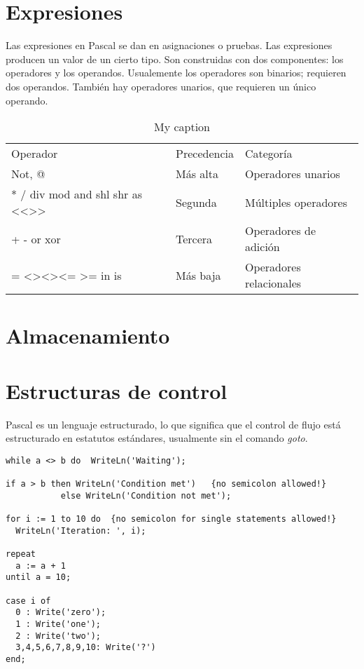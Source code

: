 \documentclass{IEEEtran}
\begin{document}
\section{Expresiones}
Las expresiones en Pascal se dan en asignaciones o pruebas. Las expresiones producen un valor de un cierto tipo. Son construidas con dos componentes: los operadores y los operandos. Usualemente los operadores son binarios; requieren dos operandos. Tambi\'en hay operadores unarios, que requieren un \'unico operando.
\begin{table}[]
\centering
\caption{My caption}
\label{my-label}
\begin{tabular}{lll}
Operador                                                                      & Precedencia & Categor\'ia             \\
Not, @                                                                        & M\'as alta  & Operadores unarios      \\
* / div mod and shl shr as \textless\textless \textgreater\textgreater        & Segunda     & M\'ultiples operadores  \\
+ - or xor                                                                    & Tercera     & Operadores de adici\'on \\
= \textless\textgreater \textless \textgreater \textless= \textgreater= in is & M\'as baja  & Operadores relacionales
\end{tabular}
\end{table}
\section{Almacenamiento}
\section{Estructuras de control}
Pascal es un lenguaje estructurado, lo que significa que el control de flujo est\'a estructurado en estatutos est\'andares, usualmente sin el comando \emph{goto}.
\begin{lstlisting}
while a <> b do  WriteLn('Waiting');

if a > b then WriteLn('Condition met')   {no semicolon allowed!}
           else WriteLn('Condition not met');

for i := 1 to 10 do  {no semicolon for single statements allowed!}
  WriteLn('Iteration: ', i);

repeat
  a := a + 1
until a = 10;

case i of
  0 : Write('zero');
  1 : Write('one');
  2 : Write('two');
  3,4,5,6,7,8,9,10: Write('?')
end;
\end{lstlisting}
\end{document}
